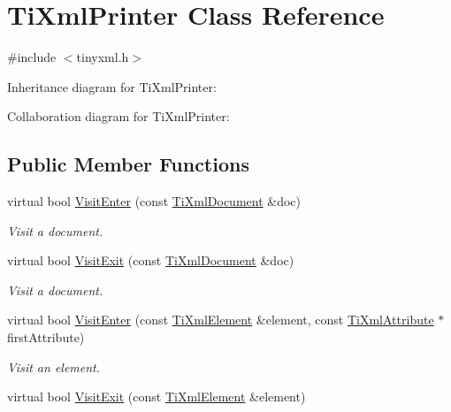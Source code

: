 \hypertarget{class_ti_xml_printer}{\section{Ti\+Xml\+Printer Class Reference}
\label{class_ti_xml_printer}
}


{\ttfamily \#include $<$tinyxml.\+h$>$}



Inheritance diagram for Ti\+Xml\+Printer\+:


Collaboration diagram for Ti\+Xml\+Printer\+:
\subsection*{Public Member Functions}
\begin{DoxyCompactItemize}
\item 
\hypertarget{class_ti_xml_printer_a2ec73087db26ff4d2c4316c56f861db7}{virtual bool \hyperlink{class_ti_xml_printer_a2ec73087db26ff4d2c4316c56f861db7}{Visit\+Enter} (const \hyperlink{class_ti_xml_document}{Ti\+Xml\+Document} \&doc)}\label{class_ti_xml_printer_a2ec73087db26ff4d2c4316c56f861db7}

\begin{DoxyCompactList}\small\item\em Visit a document. \end{DoxyCompactList}\item 
\hypertarget{class_ti_xml_printer_a0a636046fa589b6d7f3e5bd025b3f33e}{virtual bool \hyperlink{class_ti_xml_printer_a0a636046fa589b6d7f3e5bd025b3f33e}{Visit\+Exit} (const \hyperlink{class_ti_xml_document}{Ti\+Xml\+Document} \&doc)}\label{class_ti_xml_printer_a0a636046fa589b6d7f3e5bd025b3f33e}

\begin{DoxyCompactList}\small\item\em Visit a document. \end{DoxyCompactList}\item 
\hypertarget{class_ti_xml_printer_a6dccaf5ee4979f13877690afe28721e8}{virtual bool \hyperlink{class_ti_xml_printer_a6dccaf5ee4979f13877690afe28721e8}{Visit\+Enter} (const \hyperlink{class_ti_xml_element}{Ti\+Xml\+Element} \&element, const \hyperlink{class_ti_xml_attribute}{Ti\+Xml\+Attribute} $\ast$first\+Attribute)}\label{class_ti_xml_printer_a6dccaf5ee4979f13877690afe28721e8}

\begin{DoxyCompactList}\small\item\em Visit an element. \end{DoxyCompactList}\item 
\hypertarget{class_ti_xml_printer_ae6a1df8271df4bf62d7873c38e34aa69}{virtual bool \hyperlink{class_ti_xml_printer_ae6a1df8271df4bf62d7873c38e34aa69}{Visit\+Exit} (const \hyperlink{class_ti_xml_element}{Ti\+Xml\+Element} \&element)}\label{class_ti_xml_printer_ae6a1df8271df4bf62d7873c38e34aa69}


\end{DoxyCompactItemize}
